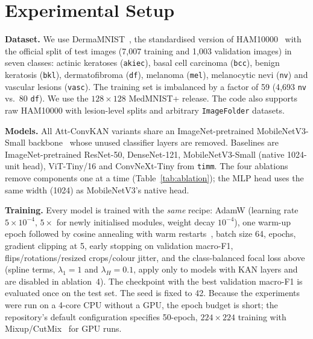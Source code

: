 \documentclass[conference]{IEEEtran}
\begin{document}
\section{Experimental Setup}
\textbf{Dataset.} We use DermaMNIST~\cite{yang2023medmnist}, the standardised version of HAM10000~\cite{tschandl2018ham10000} with the official split of  test images (7{,}007 training and 1{,}003 validation images) in seven classes: actinic keratoses (\texttt{akiec}), basal cell carcinoma (\texttt{bcc}), benign keratosis (\texttt{bkl}), dermatofibroma (\texttt{df}), melanoma (\texttt{mel}), melanocytic nevi (\texttt{nv}) and vascular lesions (\texttt{vasc}). The training set is imbalanced by a factor of 59 (4{,}693 \texttt{nv} vs.\ 80 \texttt{df}). We use the $128\times128$ MedMNIST+ release. The code also supports raw HAM10000 with lesion-level splits and arbitrary \texttt{ImageFolder} datasets.

\textbf{Models.} All Att-ConvKAN variants share an ImageNet-pretrained MobileNetV3-Small backbone~\cite{howard2019mobilenetv3} whose unused classifier layers are removed. Baselines are ImageNet-pretrained ResNet-50, DenseNet-121, MobileNetV3-Small (native 1024-unit head), ViT-Tiny/16 and ConvNeXt-Tiny from \texttt{timm}. The four ablations remove components one at a time (Table~\ref{tab:ablation}); the MLP head uses the same width (1024) as MobileNetV3's native head.

\textbf{Training.} Every model is trained with the \emph{same} recipe: AdamW (learning rate $5{\times}10^{-4}$, $5\times$ for newly initialised modules, weight decay $10^{-4}$), one warm-up epoch followed by cosine annealing with warm restarts~\cite{loshchilov2017sgdr,loshchilov2019adamw}, batch size 64,  epochs, gradient clipping at 5, early stopping on validation macro-F1, flips/rotations/resized crops/colour jitter, and the class-balanced focal loss above (spline terms, $\lambda_1=1$ and $\lambda_H=0.1$, apply only to models with KAN layers and are disabled in ablation~4). The checkpoint with the best validation macro-F1 is evaluated once on the test set. The seed is fixed to 42. Because the experiments were run on a 4-core CPU without a GPU, the epoch budget is short; the repository's default configuration specifies 50-epoch, $224\times224$ training with Mixup/CutMix~\cite{zhang2018mixup,yun2019cutmix} for GPU runs.
\end{document}
